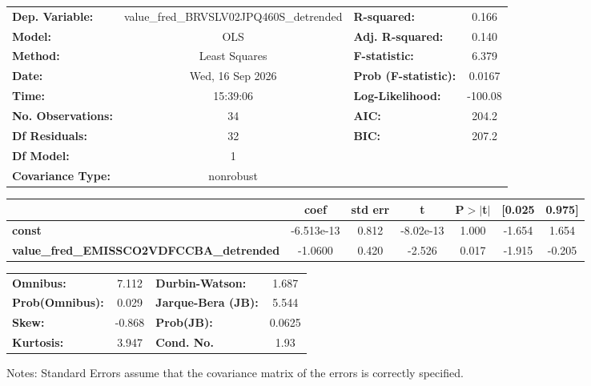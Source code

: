 \begin{center}
\begin{tabular}{lclc}
\toprule
\textbf{Dep. Variable:}                          & value\_fred\_BRVSLV02JPQ460S\_detrended & \textbf{  R-squared:         } &     0.166   \\
\textbf{Model:}                                  &                   OLS                   & \textbf{  Adj. R-squared:    } &     0.140   \\
\textbf{Method:}                                 &              Least Squares              & \textbf{  F-statistic:       } &     6.379   \\
\textbf{Date:}                                   &             Wed, 16 Sep 2026            & \textbf{  Prob (F-statistic):} &   0.0167    \\
\textbf{Time:}                                   &                 15:39:06                & \textbf{  Log-Likelihood:    } &   -100.08   \\
\textbf{No. Observations:}                       &                      34                 & \textbf{  AIC:               } &     204.2   \\
\textbf{Df Residuals:}                           &                      32                 & \textbf{  BIC:               } &     207.2   \\
\textbf{Df Model:}                               &                       1                 & \textbf{                     } &             \\
\textbf{Covariance Type:}                        &                nonrobust                & \textbf{                     } &             \\
\bottomrule
\end{tabular}
\begin{tabular}{lcccccc}
                                                 & \textbf{coef} & \textbf{std err} & \textbf{t} & \textbf{P$> |$t$|$} & \textbf{[0.025} & \textbf{0.975]}  \\
\midrule
\textbf{const}                                   &   -6.513e-13  &        0.812     & -8.02e-13  &         1.000        &       -1.654    &        1.654     \\
\textbf{value\_fred\_EMISSCO2VDFCCBA\_detrended} &      -1.0600  &        0.420     &    -2.526  &         0.017        &       -1.915    &       -0.205     \\
\bottomrule
\end{tabular}
\begin{tabular}{lclc}
\textbf{Omnibus:}       &  7.112 & \textbf{  Durbin-Watson:     } &    1.687  \\
\textbf{Prob(Omnibus):} &  0.029 & \textbf{  Jarque-Bera (JB):  } &    5.544  \\
\textbf{Skew:}          & -0.868 & \textbf{  Prob(JB):          } &   0.0625  \\
\textbf{Kurtosis:}      &  3.947 & \textbf{  Cond. No.          } &     1.93  \\
\bottomrule
\end{tabular}
\end{center}

Notes: \newline
 [1] Standard Errors assume that the covariance matrix of the errors is correctly specified.